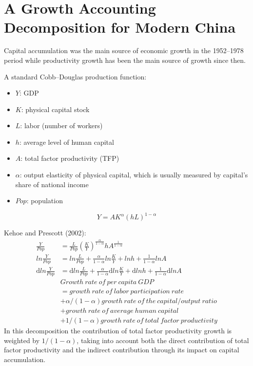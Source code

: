 \documentclass{article}
\begin{document}
    \section*{A Growth Accounting Decomposition for Modern China}
    Capital accumulation was the main source of economic growth in the 1952–1978 period while productivity growth has been the main source of growth since then.

    A standard Cobb–Douglas production function:
    \begin{itemize}
        \item $Y$: GDP
        \item $K$: physical capital stock
        \item $L$: labor (number of workers)
        \item $h$: average level of human capital
        \item $A$: total factor productivity (TFP)
        \item $\alpha$: output elasticity of physical capital, which is usually measured by capital’s share of national income
        \item $Pop$: population
    \end{itemize}
    \begin{equation*}
        Y=AK^\alpha(hL)^{1-\alpha}
    \end{equation*}

    Kehoe and Prescott (2002):
    \begin{align*}
        \frac{Y}{Pop}&=\frac{L}{Pop}(\frac{K}{Y})^{\frac{\alpha}{1-\alpha}}hA^{\frac{1}{1-\alpha}}\\
        ln\frac{Y}{Pop}&=ln\frac{L}{Pop}+\frac{\alpha}{1-\alpha}ln\frac{K}{Y}+lnh+\frac{1}{1-\alpha}lnA\\
        \mathrm{d} ln\frac{Y}{Pop}&=\mathrm{d} ln\frac{L}{Pop}+\frac{\alpha}{1-\alpha} \mathrm{d} ln\frac{K}{Y}+ \mathrm{d} lnh+\frac{1}{1-\alpha} \mathrm{d} lnA\\
        &Growth\ rate\ of\ per\ capita\ GDP\\
        &=growth\ rate\ of\ labor\ participation\ rate\\
        &+\alpha/(1-\alpha)growth\ rate\ of\ the\ capital/output\ ratio\\
        &+growth\ rate\ of\ average\ human\ capital\\
        &+1/(1-\alpha)growth\ rate\ of\ total\ factor\ productivity
    \end{align*}
    In this decomposition the contribution of total factor productivity growth is weighted by $1/(1-\alpha)$, taking into account both the direct contribution of total factor productivity and the indirect contribution through its impact on capital accumulation.
\end{document}
